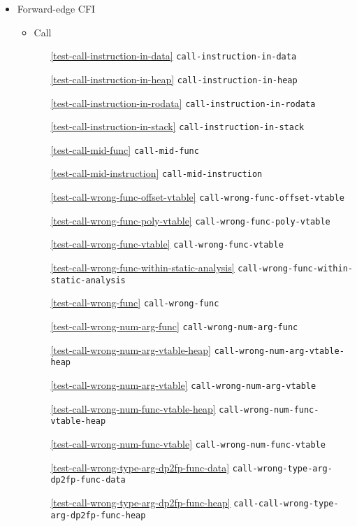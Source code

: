 \documentclass[a4paper]{book}
\begin{document}
\begin{itemize}[noitemsep]
\item Forward-edge CFI
  \begin{itemize}[noitemsep, nolistsep, leftmargin=1em]
  \item Call
    \begin{itemize}[noitemsep, nolistsep, leftmargin=1em]
    \item[\ref{test-call-instruction-in-data}]        \texttt{call-instruction-in-data}
    \item[\ref{test-call-instruction-in-heap}]        \texttt{call-instruction-in-heap}
    \item[\ref{test-call-instruction-in-rodata}]      \texttt{call-instruction-in-rodata}
    \item[\ref{test-call-instruction-in-stack}]       \texttt{call-instruction-in-stack}
    \item[\ref{test-call-mid-func}]                   \texttt{call-mid-func}
    \item[\ref{test-call-mid-instruction}]            \texttt{call-mid-instruction}
    \item[\ref{test-call-wrong-func-offset-vtable}]   \texttt{call-wrong-func-offset-vtable}
    \item[\ref{test-call-wrong-func-poly-vtable}]     \texttt{call-wrong-func-poly-vtable}
    \item[\ref{test-call-wrong-func-vtable}]          \texttt{call-wrong-func-vtable}
    \item[\ref{test-call-wrong-func-within-static-analysis}]  \texttt{call-wrong-func-within-static-analysis}
    \item[\ref{test-call-wrong-func}]                 \texttt{call-wrong-func}
    \item[\ref{test-call-wrong-num-arg-func}]         \texttt{call-wrong-num-arg-func}
    \item[\ref{test-call-wrong-num-arg-vtable-heap}]  \texttt{call-wrong-num-arg-vtable-heap}
    \item[\ref{test-call-wrong-num-arg-vtable}]       \texttt{call-wrong-num-arg-vtable}
    \item[\ref{test-call-wrong-num-func-vtable-heap}] \texttt{call-wrong-num-func-vtable-heap}
    \item[\ref{test-call-wrong-num-func-vtable}]      \texttt{call-wrong-num-func-vtable}
    \item[\ref{test-call-wrong-type-arg-dp2fp-func-data}] \texttt{call-wrong-type-arg-dp2fp-func-data}
    \item[\ref{test-call-wrong-type-arg-dp2fp-func-heap}] \texttt{call-call-wrong-type-arg-dp2fp-func-heap}

\end{itemize}
\end{itemize}
\end{itemize}
\end{document}
